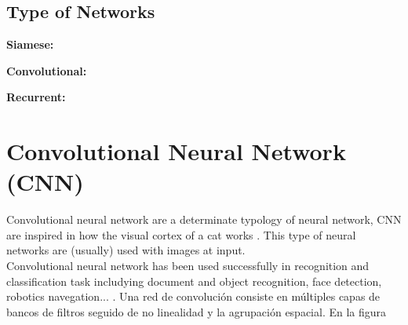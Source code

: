 \subsection{Type of Networks}

\begin{description}[noitemsep,topsep=8pt,parsep=0pt,partopsep=20pt]
	\item \textbf{Siamese:}
	\item \textbf{Convolutional:}
	\item \textbf{Recurrent:}
\end{description}

\section{Convolutional Neural Network (CNN)}
Convolutional neural network are a determinate typology of neural network, CNN are inspired in how the visual cortex of a cat works \cite{Doorn}. This type of neural networks are (usually) used with images at input.\\

Convolutional neural network has been used successfully in recognition and classification task includying document and object recognition, face detection, robotics navegation... \cite{Lecum2, Lecum3}.
 Una red de convolución consiste en múltiples capas de bancos de filtros seguido de no linealidad y la agrupación espacial. En la figura %
